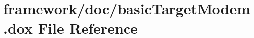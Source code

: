 \hypertarget{basic_target_modem_8dox}{}\section{framework/doc/basic\+Target\+Modem.dox File Reference}
\label{basic_target_modem_8dox}
